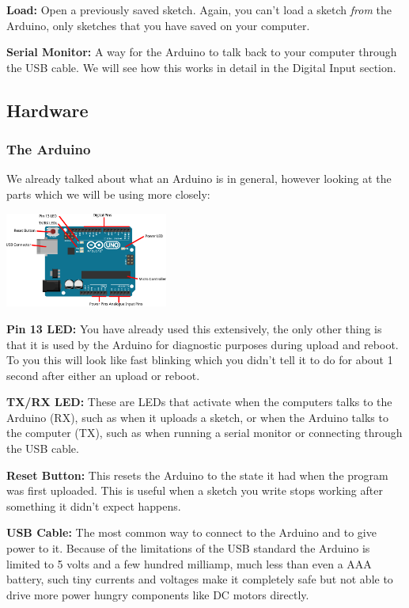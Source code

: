 \textbf{Load:} Open a previously saved sketch.
Again, you can't load a sketch \textit{from} the Arduino,
only sketches that you have saved on your computer.

\textbf{Serial Monitor:} A way for the Arduino to talk back to your computer through the USB cable.
We will see how this works in detail in the Digital Input section.


\subsection{Hardware}
\subsubsection{The Arduino}
\label{subsub:Arduino}

We already talked about what an Arduino is in general,
however looking at the parts which we will be using more closely:

\begin{center}
    \includegraphics[width=0.4\textwidth]{./Graphics/arduino_label.pdf}
\end{center}

\textbf{Pin 13 LED:} You have already used this extensively, 
the only other thing is that it is used by the Arduino for diagnostic purposes during upload and reboot. 
To you this will look like fast blinking which you didn't tell it to do for about 1 second after either an upload or reboot.

\textbf{TX/RX LED:} These are LEDs that activate when the computers talks to the Arduino (RX),
such as when it uploads a sketch, 
or when the Arduino talks to the computer (TX),
such as when running a serial monitor or connecting through the USB cable.

\textbf{Reset Button:}
This resets the Arduino to the state it had when the program was first uploaded.
This is useful when a sketch you write stops working after something it didn't expect happens.

\textbf{USB Cable:}
The most common way to connect to the Arduino and to give power to it.
Because of the limitations of the USB standard the Arduino is limited to 
5 volts and a few hundred milliamp,
much less than even a AAA battery,
such tiny currents and voltages make it completely safe 
but not able to drive more power hungry components like DC motors directly.

